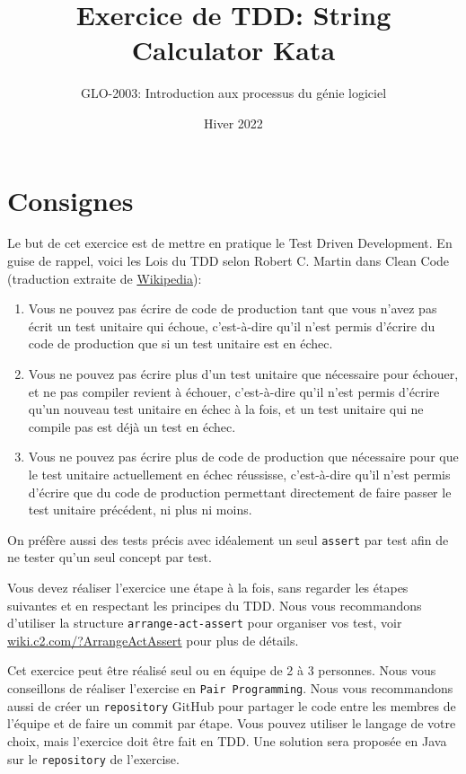 \documentclass[french]{article}
\title{Exercice de TDD: String Calculator Kata}
\author{GLO-2003: Introduction aux processus du génie logiciel}
\date{Hiver 2022}
\begin{document}
\maketitle

\section{Consignes}

Le but de cet exercice est de mettre en pratique le Test Driven Development. En guise de rappel, voici les \guillemotleft Lois du TDD \guillemotright selon Robert C. Martin dans Clean Code\cite{martinClean} (traduction extraite de \href{https://www.wikiwand.com/fr/Test_driven_development}{Wikipedia}):

\begin{enumerate}
    \item Vous ne pouvez pas écrire de code de production tant que vous n'avez pas écrit un test unitaire qui échoue, c'est-à-dire qu'il n'est permis d'écrire du code de production que si un test unitaire est en échec.
    \item Vous ne pouvez pas écrire plus d'un test unitaire que nécessaire pour échouer, et ne pas compiler revient à échouer, c'est-à-dire qu'il n'est permis d'écrire qu'un nouveau test unitaire en échec à la fois, et un test unitaire qui ne compile pas est déjà un test en échec.
    \item Vous ne pouvez pas écrire plus de code de production que nécessaire pour que le test unitaire actuellement en échec réussisse, c'est-à-dire qu'il n'est permis d'écrire que du code de production permettant directement de faire passer le test unitaire précédent, ni plus ni moins.
\end{enumerate}

On préfère aussi des tests précis avec idéalement un seul \texttt{assert} par test afin de ne tester qu'un seul concept par test.

Vous devez réaliser l'exercice une étape à la fois, sans regarder les étapes suivantes et en respectant les principes du TDD. Nous vous recommandons d'utiliser la structure \texttt{arrange-act-assert} pour organiser vos test, voir \href{http://wiki.c2.com/?ArrangeActAssert}{wiki.c2.com/?ArrangeActAssert} pour plus de détails.

Cet exercice peut être réalisé seul ou en équipe de 2 à 3 personnes. Nous vous conseillons de réaliser l'exercise en \texttt{Pair Programming}. Nous vous recommandons aussi de créer un \texttt{repository} GitHub pour partager le code entre les membres de l'équipe et de faire un commit par étape. Vous pouvez utiliser le langage de votre choix, mais l'exercice doit être fait en TDD. Une solution sera proposée en Java sur le \texttt{repository} de l'exercise.
\end{document}
